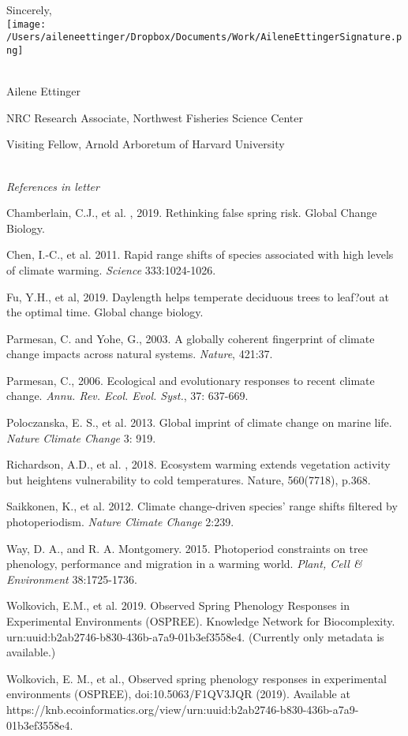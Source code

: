 \documentclass[10.7pt,a4paper]{letter} %
\begin{document}
\begin{letter}{}
Sincerely,\\
\texttt{[image: /Users/aileneettinger/Dropbox/Documents/Work/AileneEttingerSignature.png]} \\

\\
\begin{footnotesize}
Ailene Ettinger

NRC Research Associate, Northwest Fisheries Science Center

Visiting Fellow, Arnold Arboretum of Harvard University
\end{footnotesize}
\\
\noindent \emph{References in letter}
\begin{footnotesize}

\item Chamberlain, C.J., et al. , 2019. Rethinking false spring risk. Global Change Biology.

\item Chen, I.-C., et al. 2011. Rapid range shifts of species associated with high levels of climate warming.  \emph{Science} 333:1024-1026.
\item Fu, Y.H., et al, 2019. Daylength helps temperate deciduous trees to leaf?out at the optimal time. Global change biology.

\item Parmesan, C. and Yohe, G., 2003. A globally coherent fingerprint of climate change impacts across natural systems.  \emph{Nature}, 421:37.

\item Parmesan, C., 2006. Ecological and evolutionary responses to recent climate change.  \emph{Annu. Rev. Ecol. Evol. Syst.}, 37: 637-669.

\item Poloczanska, E. S., et al. 2013. Global imprint of climate change on marine life. \emph{Nature Climate Change} 3: 919.

\item Richardson, A.D., et al. , 2018. Ecosystem warming extends vegetation activity but heightens vulnerability to cold temperatures. Nature, 560(7718), p.368.

\item Saikkonen, K., et al. 2012. Climate change-driven species' range shifts filtered by photoperiodism. \emph{Nature Climate Change} 2:239.

\item Way, D. A., and R. A. Montgomery. 2015. Photoperiod constraints on tree phenology, performance and migration in a warming world. \emph{Plant, Cell \& Environment} 38:1725-1736.
\item Wolkovich, E.M.,  et al. 2019. Observed Spring Phenology Responses in Experimental Environments (OSPREE). Knowledge Network for Biocomplexity. urn:uuid:b2ab2746-b830-436b-a7a9-01b3ef3558e4. (Currently only metadata is available.)
\item Wolkovich, E. M.,  et al., Observed spring phenology responses in experimental environments (OSPREE), doi:10.5063/F1QV3JQR (2019). Available at https://knb.ecoinformatics.org/view/urn:uuid:b2ab2746-b830-436b-a7a9-01b3ef3558e4.


\end{footnotesize}
\end{letter}
\end{document}
